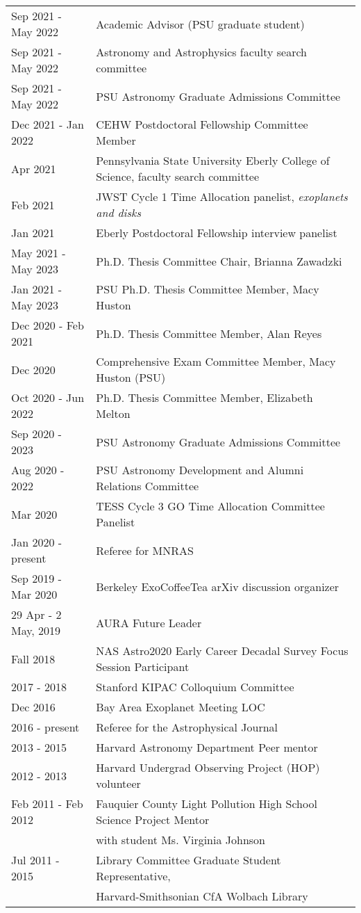 \begin{tabular*}{\textwidth}{@{\hspace{10pt}}p{1.4in}l}
Sep 2021 - May 2022 & Academic Advisor (PSU graduate student) \\ %
Sep 2021 - May 2022 & Astronomy and Astrophysics faculty search committee\\
Sep 2021 - May 2022 & PSU Astronomy Graduate Admissions Committee \\ 
Dec 2021 - Jan 2022 & CEHW Postdoctoral Fellowship Committee Member \\
Apr 2021 & Pennsylvania State University Eberly College of Science, faculty search committee\\
Feb 2021 & JWST Cycle 1 Time Allocation panelist, \emph{exoplanets and disks}\\
Jan 2021 & Eberly Postdoctoral Fellowship interview panelist\\
May 2021 - May 2023 & Ph.D. Thesis Committee Chair, Brianna Zawadzki\\
Jan 2021 - May 2023 & PSU Ph.D. Thesis Committee Member, Macy Huston\\
Dec 2020 - Feb 2021 & Ph.D. Thesis Committee Member, Alan Reyes\\
Dec 2020 & Comprehensive Exam Committee Member, Macy Huston (PSU)\\
Oct 2020 - Jun 2022 & Ph.D. Thesis Committee Member, Elizabeth Melton\\
Sep 2020 - 2023 & PSU Astronomy Graduate Admissions Committee \\ 
Aug 2020 - 2022 & PSU Astronomy Development and Alumni Relations Committee \\
Mar 2020 & TESS Cycle 3 GO Time Allocation Committee Panelist \\
Jan 2020 - present & Referee for MNRAS \\ 
Sep 2019 - Mar 2020 & Berkeley ExoCoffeeTea arXiv discussion organizer \\ 
29 Apr - 2 May, 2019 & AURA Future Leader \\
Fall 2018 & NAS Astro2020 Early Career Decadal Survey Focus Session Participant \\
2017 - 2018 & Stanford KIPAC Colloquium Committee \\
Dec 2016 & Bay Area Exoplanet Meeting LOC \\
2016 - present & Referee for the Astrophysical Journal \\
2013 - 2015 & Harvard Astronomy Department Peer mentor\\
2012 - 2013 & Harvard Undergrad Observing Project (HOP) volunteer\\
Feb 2011 - Feb 2012 & Fauquier County Light Pollution High School Science Project Mentor\\
& with student Ms. Virginia Johnson\\
Jul 2011 - 2015 & Library Committee Graduate Student Representative,\\
& Harvard-Smithsonian CfA Wolbach Library\\
\end{tabular*}
